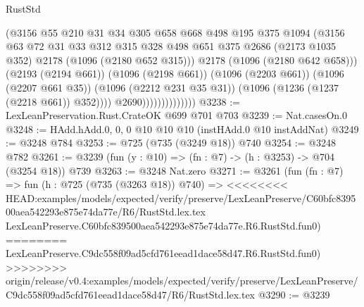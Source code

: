 \begin{lexlean}{RustStd}
\begin{coremodule}
{\begin{coremodule}
{{{{{{{{{{                                    (@3156
                                      @55
                                      @210
                                      @31
                                      @34
                                      @305
                                      @658
                                      @668
                                      @498
                                      @195
                                      @375
                                      @1094
                                      (@3156
                                        @63
                                        @72
                                        @31
                                        @33
                                        @312
                                        @315
                                        @328
                                        @498
                                        @651
                                        @375
                                        @2686
                                        (@2173 @1035 @352)
                                        @2178
                                        (@1096 (@2180 @652 @315)))
                                      @2178
                                      (@1096 (@2180 @642 @658)))
                                    (@2193 (@2194 @661))
                                    (@1096 (@2198 @661))
                                    (@1096 (@2203 @661))
                                    (@1096 (@2207 @661 @35))
                                    (@1096 (@2212 @231 @35 @31))
                                    (@1096 (@1236 (@1237 (@2218 @661)) @352))))
                                @2690))))))))))))))
@3238 := LexLeanPreservation.Rust.CrateOK @699 @701 @703
@3239 := Nat.casesOn.{0}
@3248 := HAdd.hAdd.{0, 0, 0} @10 @10 @10 (instHAdd.{0} @10 instAddNat)
@3249 := @3248 @784
@3253 := @725 (@735 (@3249 @18)) @740
@3254 := @3248 @782
@3261 := @3239 (fun (y : @10) => (fn : @7) -> (h : @3253) -> @704 (@3254 @18)) @739
@3263 := @3248 Nat.zero
@3271 := @3261
    (fun (fn : @7) =>
    fun (h : @725 (@735 (@3263 @18)) @740) =>
<<<<<<<< HEAD:examples/models/expected/verify/preserve/LexLeanPreserve/C60bfc839500aea542293e875e74da77e/R6/RustStd.lex.tex
    LexLeanPreserve.C60bfc839500aea542293e875e74da77e.R6.RustStd.fun0)
========
    LexLeanPreserve.C9dc558f09ad5cfd761eead1dace58d47.R6.RustStd.fun0)
>>>>>>>> origin/release/v0.4:examples/models/expected/verify/preserve/LexLeanPreserve/C9dc558f09ad5cfd761eead1dace58d47/R6/RustStd.lex.tex
@3290 := @3239
}}}}}}}}}}
\end{coremodule}}
\end{coremodule}
\end{lexlean}
